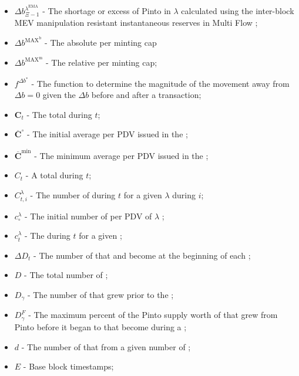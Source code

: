 \documentclass[class=article, crop=false]{standalone}
\begin{document}
\begin{itemize}[topsep=0pt, itemsep=3pt,leftmargin=16pt]
    \item[] $\Delta b_{\Xi-1}^{\lambda^{\text{EMA}}}$ - The shortage or excess of Pinto in $\lambda$ calculated using the inter-block MEV manipulation resistant instantaneous reserves in Multi Flow ;
    \item[] $\Delta b^{\text{MAX}^{\text{b}}}$ - The absolute per  minting cap
    \item[] $\Delta b^{\text{MAX}^{\text{m}}}$ - The relative per  minting cap;
    \item[] $f^{\Delta b^{*}}$ - The function to determine the magnitude of the movement away from $\Delta b = 0$ given the $\Delta b$ before and after a transaction;
    \item[] $\mathbf{C}_{t}$ - The total  during $t$;
    \item[] $\overline{\mathbf{C}}^{\circ}$ - The initial average  per PDV issued in the ;
    \item[] $\overline{\mathbf{C}}^{\text{min}}$ - The minimum average  per PDV issued in the ;
    \item[] $C_{t}$ - A  total  during $t$;
    \item[] $C_{t,i}^{\lambda}$ - The number of  during $t$ for a given $\lambda$   during $i$;
    \item[] $c_{\circ}^{\lambda}$ - The initial number of  per PDV of $\lambda$ ;
    \item[] $c_{t}^{\lambda}$ - The  during $t$ for a given ;
    \item[] $\Delta D_{t}$ - The number of  that  and become  at the beginning of each ;
    \item[] $D$ - The total number of ;
    \item[] $D_{\gamma}$ - The number of  that grew prior to the ;
    \item[] $D_{\gamma}^{F}$ - The maximum percent of the Pinto supply worth of  that grew from Pinto  before it began to  that become  during a ;
    \item[] $d$ - The number of  that  from a given number of  \Pinto;
    \item[] $E$ - Base block timestamps;

\end{itemize}
\end{document}
